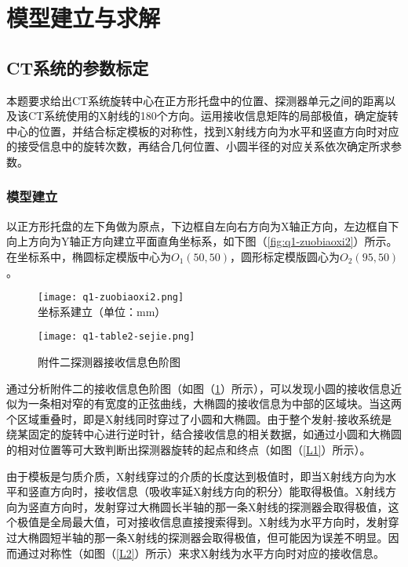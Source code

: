 \documentclass[withoutpreface,bwprint]{cumcmthesis} %
\begin{document}
\newpage
\section{模型建立与求解}
\subsection{CT系统的参数标定}
\par 本题要求给出CT系统旋转中心在正方形托盘中的位置、探测器单元之间的距离以及该CT系统使用的X射线的180个方向。运用接收信息矩阵的局部极值，确定旋转中心的位置，并结合标定模板的对称性，找到X射线方向为水平和竖直方向时对应的接受信息中的旋转次数，再结合几何位置、小圆半径的对应关系依次确定所求参数。
\subsubsection{模型建立}

\par 以正方形托盘的左下角做为原点，下边框自左向右方向为X轴正方向，左边框自下向上方向为Y轴正方向建立平面直角坐标系，如下图（\ref{fig:q1-zuobiaoxi2}）所示。在坐标系中，椭圆标定模版中心为$O_1(50,50)$，圆形标定模版圆心为$O_2(95,50)$。

\begin{figure}[!htbp]  
\begin{minipage}[t]{0.5\textwidth}
\centering  
\texttt{[image: q1-zuobiaoxi2.png]} \\
\caption{坐标系建立（单位：mm）} \label{fig:q1-zuobiaoxi2}
\end{minipage}
\hspace{1ex}
\begin{minipage}[t]{0.5\textwidth}  
\centering  
\texttt{[image: q1-table2-sejie.png]}\\
\caption{附件二探测器接收信息色阶图}  \label{fig:q1-table2-sejie}
\end{minipage}  
\end{figure} 

\par 通过分析附件二的接收信息色阶图（如图（\ref{fig:q1-table2-sejie}）所示），可以发现小圆的接收信息近似为一条相对窄的有宽度的正弦曲线，大椭圆的接收信息为中部的区域块。当这两个区域重叠时，即是X射线同时穿过了小圆和大椭圆。由于整个发射-接收系统是绕某固定的旋转中心进行逆时针，结合接收信息的相关数据，如通过小圆和大椭圆的相对位置等可大致判断出探测器旋转的起点和终点（如图（\ref{L1}）所示）。

\par 由于模板是匀质介质，X射线穿过的介质的长度达到极值时，即当X射线方向为水平和竖直方向时，接收信息（吸收率延X射线方向的积分）能取得极值。X射线方向为竖直方向时，发射穿过大椭圆长半轴的那一条X射线的探测器会取得极值，这个极值是全局最大值，可对接收信息直接搜索得到。X射线为水平方向时，发射穿过大椭圆短半轴的那一条X射线的探测器会取得极值，但可能因为误差不明显。因而通过对称性（如图（\ref{L2}）所示）来求X射线为水平方向时对应的接收信息。
\end{document}
